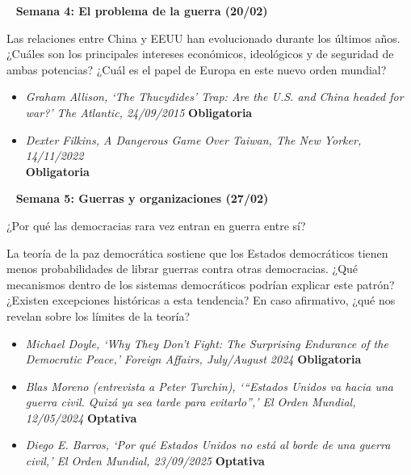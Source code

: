 \documentclass[11pt, a4paper]{article}
\begin{document}
\begin{center} 
\begin{minipage}{6in}
\begin{flushleft}
{\color{darkgreen}{\Rectangle}} ~ \textbf{{\large{Semana 4: El problema de la guerra (20/02)}}}
\end{flushleft}
Las relaciones entre China y EEUU han evolucionado durante los últimos años. ¿Cuáles son los principales intereses económicos, ideológicos y de seguridad de ambas potencias? ¿Cuál es el papel de Europa en este nuevo orden mundial?

\begin{itemize}
    \item \emph{Graham Allison, ‘The Thucydides’ Trap: Are the U.S. and China headed for war?’ The Atlantic, 24/09/2015
} \textbf{Obligatoria}

\item \emph{Dexter Filkins, A Dangerous Game Over Taiwan, The New Yorker, 14/11/2022} \\ \textbf{Obligatoria}
\end{itemize}
\end{minipage}
\end{center}

\begin{center} 
\begin{minipage}{6in}
\begin{flushleft}
{\color{darkgreen}{\Rectangle}} ~ \textbf{{\large{Semana 5: Guerras y organizaciones (27/02)}}}
\end{flushleft}
¿Por qué las democracias rara vez entran en guerra entre sí? \vspace{0,5em}

La teoría de la paz democrática sostiene que los Estados democráticos tienen menos probabilidades de librar guerras contra otras democracias. ¿Qué mecanismos dentro de los sistemas democráticos podrían explicar este patrón? ¿Existen excepciones históricas a esta tendencia? En caso afirmativo, ¿qué nos revelan sobre los límites de la teoría?

\begin{itemize}
    \item \emph{Michael Doyle, ‘Why They Don’t Fight: The Surprising Endurance of the Democratic Peace,’ Foreign Affairs, July/August 2024} \textbf{Obligatoria}

\item \emph{Blas Moreno (entrevista a Peter Turchin), ‘“Estados Unidos va hacia una guerra civil. Quizá ya sea tarde para evitarlo”,’ El Orden Mundial, 12/05/2024} \textbf{Optativa}

\item \emph{Diego E. Barros, ‘Por qué Estados Unidos no está al borde de una guerra civil,’ El Orden Mundial, 23/09/2025} \textbf{Optativa} 
\end{itemize}

\end{minipage}
\end{center}
\end{document}
